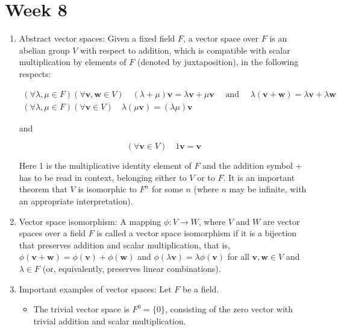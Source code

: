 \documentclass{article}
\begin{document}
\section{Week 8}
    \begin{enumerate}
        \item Abstract vector spaces: Given a fixed field $F$, a vector space over $F$ is an abelian group $V$ with respect to addition, which is compatible with scalar multiplication by elements of $F$ (denoted by juxtaposition), in the following respects:

        $$
        \begin{gathered}
        (\forall \lambda, \mu \in F)(\forall \mathbf{v}, \mathbf{w} \in V) \quad(\lambda+\mu) \mathbf{v}=\lambda \mathbf{v}+\mu \mathbf{v} \quad \text { and } \quad \lambda(\mathbf{v}+\mathbf{w})=\lambda \mathbf{v}+\lambda \mathbf{w} \\
        (\forall \lambda, \mu \in F)(\forall \mathbf{v} \in V) \quad \lambda(\mu \mathbf{v})=(\lambda \mu) \mathbf{v}
        \end{gathered}
        $$

        and

        $$
        (\forall \mathbf{v} \in V) \quad 1 \mathbf{v}=\mathbf{v}
        $$

        Here 1 is the multiplicative identity element of $F$ and the addition symbol + has to be read in context, belonging either to $V$ or to $F$. It is an important theorem that $V$ is isomorphic to $F^{n}$ for some $n$ (where $n$ may be infinite, with an appropriate interpretation).

        \item Vector space isomorphism: A mapping $\phi: V \rightarrow W$, where $V$ and $W$ are vector spaces over a field $F$ is called a vector space isomorphism if it is a bijection that preserves addition and scalar multiplication, that is, $\phi(\mathbf{v}+\mathbf{w})=\phi(\mathbf{v})+\phi(\mathbf{w})$ and $\phi(\lambda \mathbf{v})=\lambda \phi(\mathbf{v})$ for all $\mathbf{v}, \mathbf{w} \in V$ and $\lambda \in F$ (or, equivalently, preserves linear combinations).

        \item Important examples of vector spaces: Let $F$ be a field.
            \begin{itemize}
                \item The trivial vector space is $F^{0}=\{0\}$, consisting of the zero vector with trivial addition and scalar multiplication.


\end{itemize}
\end{enumerate}
\end{document}
